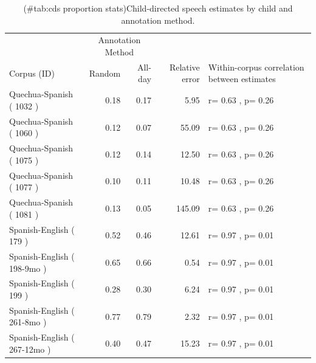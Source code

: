 \documentclass[
]{article}
\begin{document}
\begin{table}[!h]

\caption{(\#tab:cds proportion stats)Child-directed speech estimates by child and annotation method.}
\centering
\begin{tabular}[t]{lrrr>{\raggedright\arraybackslash}p{5cm}}
\toprule
\multicolumn{1}{c}{ } & \multicolumn{2}{c}{Annotation Method} & \multicolumn{2}{c}{ } \\
\cmidrule(l{3pt}r{3pt}){2-3}
Corpus (ID) & Random & All-day & Relative error & Within-corpus correlation between estimates\\
\midrule
Quechua-Spanish ( 1032 ) & 0.18 & 0.17 & 5.95 & r= 0.63 , p= 0.26\\
Quechua-Spanish ( 1060 ) & 0.12 & 0.07 & 55.09 & r= 0.63 , p= 0.26\\
Quechua-Spanish ( 1075 ) & 0.12 & 0.14 & 12.50 & r= 0.63 , p= 0.26\\
Quechua-Spanish ( 1077 ) & 0.10 & 0.11 & 10.48 & r= 0.63 , p= 0.26\\
Quechua-Spanish ( 1081 ) & 0.13 & 0.05 & 145.09 & r= 0.63 , p= 0.26\\
\addlinespace
Spanish-English ( 179 ) & 0.52 & 0.46 & 12.61 & r= 0.97 , p= 0.01\\
Spanish-English ( 198-9mo ) & 0.65 & 0.66 & 0.54 & r= 0.97 , p= 0.01\\
Spanish-English ( 199 ) & 0.28 & 0.30 & 6.24 & r= 0.97 , p= 0.01\\
Spanish-English ( 261-8mo ) & 0.77 & 0.79 & 2.32 & r= 0.97 , p= 0.01\\
Spanish-English ( 267-12mo ) & 0.40 & 0.47 & 15.23 & r= 0.97 , p= 0.01\\
\bottomrule
\end{tabular}
\end{table}
\end{document}
